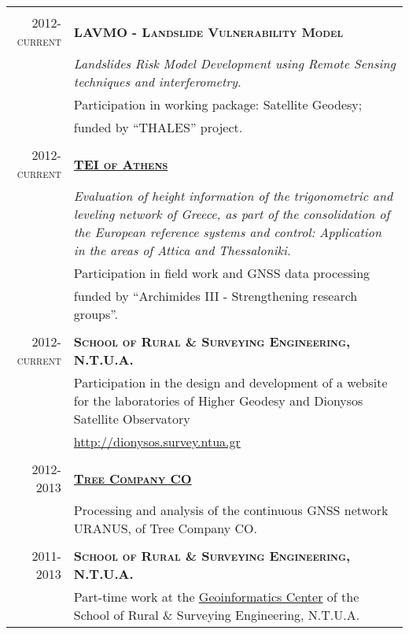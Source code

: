 \documentclass[a4paper,10pt]{article} %
\begin{document}
\begin{longtable}{r|p{13cm}}
\multicolumn{2}{c}{} \\ 
\textsc{2012-current} & \textsc{\textbf{LAVMO - Landslide Vulnerability Model}}\\
  & \textit{Landslides Risk Model Development using Remote Sensing techniques and interferometry.}\\
  & Participation in working package: Satellite Geodesy;\\
  & funded by \textquotedblleft THALES\textquotedblright{} project.\\

\multicolumn{2}{c}{} \\
\textsc{2012-current} & \textbf{\textsc{\href{http://www.teiath.gr/?lang=en}{TEI of Athens}}}\\
  & \textit{Evaluation of height information of the trigonometric and leveling network of Greece, as part of the consolidation of the European reference systems and control: Application in the areas of Attica and Thessaloniki.}\\
  & Participation in field work and GNSS data processing \\
  & funded by \textquotedblleft Archimides III - Strengthening research groups\textquotedblright{}.\\

\multicolumn{2}{c}{} \\
\textsc{2012-current} & \textbf{\textsc{School of Rural \& Surveying Engineering, N.T.U.A.}}\\
  & Participation in the design and development of a website for the laboratories of Higher Geodesy and Dionysos Satellite Observatory\\
  & \url{http://dionysos.survey.ntua.gr}\\

\multicolumn{2}{c}{} \\
\textsc{2012-2013} & \textbf{\textsc{\href{http://www.treecomp.gr/}{Tree Company CO}}}\\
  & Processing and analysis of the continuous GNSS network URANUS, of Tree Company CO.\\

\multicolumn{2}{c}{} \\
\textsc{2011-2013} & \textbf{\textsc{School of Rural \& Surveying Engineering, N.T.U.A.}}\\
  & Part-time work at the \href{http://portal.survey.ntua.gr/main/geocenter/geocen-g.html}{Geoinformatics Center} of the School of Rural \& Surveying Engineering, N.T.U.A.\\


\end{longtable}
\end{document}
